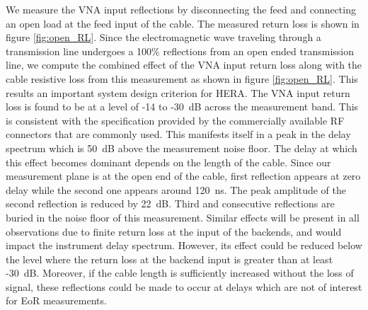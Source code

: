 \documentclass[twocolumn]{emulateapj}
\begin{document}
     We
    measure the VNA input reflections by disconnecting the feed and connecting an
    open load at the feed input of the cable. The measured return loss is shown in
    figure \ref{fig:open_RL}. Since the electromagnetic wave traveling through
    a transmission line undergoes a 100$\%$ reflections from an open ended
    transmission line, we compute the combined effect of the VNA input return loss
    along with the cable resistive loss from this measurement as shown in figure
    \ref{fig:open_RL}. This results an important system design criterion for HERA.
    The VNA input return loss is found to be at a level of -14 to -30~dB across
    the measurement band. This is consistent with the specification provided by the
    commercially available RF connectors that are commonly used. This manifests
    itself in a peak in the delay spectrum which is 50~dB above the measurement
    noise floor. The delay at which this effect becomes dominant depends on the
    length of the cable. Since our measurement plane is at the open end of the cable,
    first reflection appears at zero delay while the second one appears around 120~ns. 
    The peak amplitude of the second reflection is reduced by 22~dB. Third and 
    consecutive reflections are buried in the noise floor of this measurement. Similar effects
     will be present in all observations due to  finite return loss at the input of the backends,
     and would impact the
    instrument delay spectrum. However, its effect could be reduced below the level
    where the return loss at the backend input is greater
    than at least -30~dB. Moreover, if the cable length is sufficiently increased
    without the loss of signal, these reflections could be made to occur at delays
    which are not of interest for EoR measurements.
    
\end{document}
